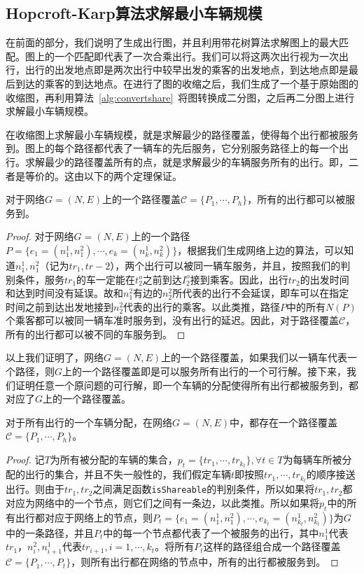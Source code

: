 \subsection{Hopcroft-Karp算法求解最小车辆规模}
在前面的部分，我们说明了生成出行图，并且利用带花树算法求解图上的最大匹配。图上的一个匹配即代表了一次合乘出行。我们可以将这两次出行视为一次出行，出行的出发地点即是两次出行中较早出发的乘客的出发地点，到达地点即是最后到达的乘客的到达地点。在进行了图的收缩之后，我们生成了一个基于原始图的收缩图，再利用算法~\ref{alg:convertshare}~将图转换成二分图，之后再二分图上进行求解最小车辆规模。
\par
在收缩图上求解最小车辆规模，就是求解最少的路径覆盖，使得每个出行都被服务到。图上的每个路径都代表了一辆车的先后服务，它分别服务路径上的每一个出行。求解最少的路径覆盖所有的点，就是求解最少的车辆服务所有的出行。即，二者是等价的。这由以下的两个定理保证。
\begin{theorem}\label{theo:pathshare}
对于网络$G = (N, E)$上的一个路径覆盖$\mathcal{C} = \{P_1,\cdots, P_h\}$，所有的出行都可以被服务到。
\end{theorem}

\begin{proof}
对于网络$G = (N,E)$上的一个路径$P= \{e_1 = (n_1^1, n_1^2),\cdots, e_k = (n_k^1,n_k^2)\}$，根据我们生成网络上边的算法，可以知道$n_1^1,n_1^2$（记为$tr_1,tr-2$），两个出行可以被同一辆车服务，并且，按照我们的判别条件，服务$tr_1$的车一定能在$t_2^o$之前到达$I_2^o$接到乘客。因此，出行$tr_2$的出发时间和达到时间没有延误。故和$n_1^2$有边的$n_2^2$所代表的出行不会延误，即车可以在指定时间之前到达出发地接到$n_2^2$代表的出行的乘客。以此类推，路径$P$中的所有$N(P)$个乘客都可以被同一辆车准时服务到，没有出行的延迟。因此，对于路径覆盖$\mathcal{C}$，所有的出行都可以被不同的车服务到。
\end{proof}
\par
以上我们证明了，网络$G = (N, E)$上的一个路径覆盖，如果我们以一辆车代表一个路径，则$G$上的一个路径覆盖即是可以服务所有出行的一个可行解。接下来，我们证明任意一个原问题的可行解，即一个车辆的分配使得所有出行都被服务到，都对应了$G$上的一个路径覆盖。
\begin{theorem}\label{theo:originshare}
对于所有出行的一个车辆分配，在网络$G = (N, E)$中，都存在一个路径覆盖$\mathcal{C} = \{P_1,\cdots, P_h\}$。
\end{theorem}
\begin{proof}
记$T$为所有被分配的车辆的集合，$p_t = \{tr_1,\cdots, tr_{k_t}\}, \forall t \in T$为每辆车所被分配的出行的集合，并且不失一般性的，我们假定车辆$t$即按照$tr_1,\cdots,tr_{k_t}$的顺序接送出行。则由于$tr_1,tr_2$之间满足函数\texttt{isShareable}的判别条件，所以如果将$tr_1,tr_2$都对应为网络中的一个节点，则它们之间有一条边，以此类推。所以如果将$p_t$中的所有出行都对应于网络上的节点，则$P_t = \{e_1 = (n_1^1, n_1^2),\cdots, e_{k_t} = (n_{k_t}^1, n_{k_t}^2)\}$为$G$中的一条路径，并且$P_t$中的每一个节点都代表了一个被服务的出行，其中$n_1^1$代表$tr_1$，$n_i^2, n_{i+1}^1$代表$tr_{i+1}, i = 1,\cdots, k_t$。将所有$P_t$这样的路径组合成一个路径覆盖$\mathcal{C} = \{P_1,\cdots, P_t\}$，则所有出行都在网络的节点中，所有的出行都被服务到。
\end{proof}

